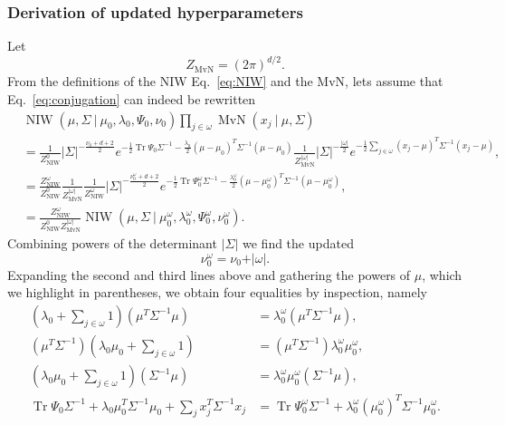 \documentclass[11pt, oneside]{article}   	%
\DeclareMathOperator{\Tr}{Tr}
\DeclareMathOperator{\NIW}{NIW}
\DeclareMathOperator{\MvN}{MvN}
\begin{document}
\subsubsection{Derivation of updated hyperparameters}
Let
$$Z_{\MvN} = (2\pi)^{d/2}.$$
From the definitions of the NIW Eq.~\ref{eq:NIW} and the MvN, lets assume that Eq.~\ref{eq:conjugation} can indeed be rewritten
\begin{equation}\begin{split}
&\NIW(\mu, \Sigma~\vert~ \mu_0, \lambda_0,\Psi_0,\nu_0)\prod_{j\in\omega}\operatorname{MvN}(x_j~\vert~\mu,\Sigma)\\
& = \frac{1}{Z^0_{\NIW}}\vert\Sigma\vert^{-\frac{\nu_0 + d + 2}{2}} e^{-\frac{1}{2}\Tr\Psi_0\Sigma^{-1}-\frac{\lambda_0}{2}(\mu - \mu_0)^T \Sigma^{-1}(\mu - \mu_0)}\frac{1}{Z_{\MvN}^{\vert\omega\vert}}\vert\Sigma\vert^{-\frac{\vert\omega\vert}{2}} e^{-\frac{1}{2}\sum_{j\in\omega}(x_j - \mu)^T\Sigma^{-1}(x_j - \mu)},\\
&=  \frac{Z^\omega_{\NIW}}{Z^0_{\NIW}}\frac{1}{Z_{\MvN}^{\vert\omega\vert}} \frac{1}{Z^\omega_{\NIW}}\vert\Sigma\vert^{-\frac{\nu_0^\omega + d + 2}{2}}e^{-\frac{1}{2}\Tr\Psi_0^\omega\Sigma^{-1} - \frac{\lambda_0^\omega}{2}(\mu - \mu_0^\omega)^T\Sigma^{-1}(\mu - \mu_0^\omega)},\\
&= \frac{Z^\omega_{\NIW}}{Z^0_{\NIW} Z_{\MvN}^{\vert\omega\vert}} \NIW(\mu,\Sigma~\vert~\mu_0^\omega,\lambda_0^\omega,\Psi_0^\omega,\nu_0^\omega).
\label{eq:niw}\end{split}\end{equation}
Combining powers of the determinant $\vert\Sigma\vert$ we find the updated
$$\nu_0^\omega = \nu_0 + \vert\omega\vert.$$
Expanding the second and third lines above and gathering the powers of $\mu$, which we highlight in parentheses, we obtain four equalities by inspection, namely
\begin{equation}\begin{split}
(\lambda_0 + \sum_{j\in\omega} 1)\left(\mu^T\Sigma^{-1}\mu\right) &= \lambda_0^\omega\left(\mu^T\Sigma^{-1}\mu\right),\\
\left(\mu^T\Sigma^{-1}\right)(\lambda_0\mu_0 + \sum_{j\in\omega} 1 ) &= \left(\mu^T\Sigma^{-1}\right)\lambda_0^\omega \mu_0^\omega,\\
(\lambda_0\mu_0 + \sum_{j\in\omega} 1)\left(\Sigma^{-1}\mu\right) &= \lambda_0^\omega \mu_0^\omega\left(\Sigma^{-1}\mu\right),\\
\Tr\Psi_0\Sigma^{-1} + \lambda_0\mu_0^T\Sigma^{-1}\mu_0 + \sum_j x_j^T\Sigma^{-1} x_j &= \Tr\Psi_0^\omega\Sigma^{-1} + \lambda_0^\omega(\mu_0^\omega)^T\Sigma^{-1}\mu_0^\omega.
\end{split}\end{equation}
\end{document}
